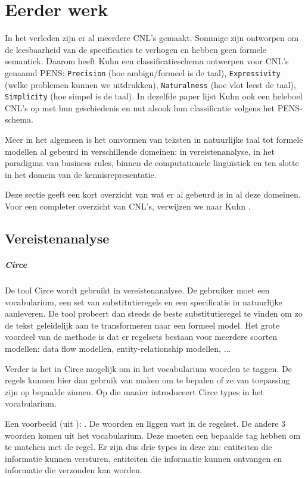 \chapter{Eerder werk}
\label{ch:related}
In het verleden zijn er al meerdere CNL's gemaakt. Sommige zijn ontworpen om de leesbaarheid van de specificaties te verhogen en hebben geen formele semantiek. Daarom heeft Kuhn \cite{Kuhn2014} een classificatieschema ontwerpen voor CNL's genaamd PENS: \texttt{Precision} (hoe ambigu/formeel is de taal), \texttt{Expressivity} (welke problemen kunnen we uitdrukken), \texttt{Naturalness} (hoe vlot leest de taal), \texttt{Simplicity} (hoe simpel is de taal). In dezelfde paper lijst Kuhn ook een heleboel CNL's op met hun geschiedenis en nut alsook hun classificatie volgens het PENS-schema.

Meer in het algemeen is het omvormen van teksten in natuurlijke taal tot formele modellen al gebeurd in verschillende domeinen: in vereistenanalyse, in het paradigma van business rules, binnen de computationele lingu\"istiek en ten slotte in het domein van de kennisrepresentatie.

Deze sectie geeft een kort overzicht van wat er al gebeurd is in al deze domeinen. Voor een completer overzicht van CNL's, verwijzen we naar Kuhn \cite{Kuhn2014}.

\section{Vereistenanalyse}
\paragraph{Circe} De tool Circe \cite{Ambriola1997} wordt gebruikt in vereistenanalyse. De gebruiker moet een vocabularium, een set van substitutieregels en een specificatie in natuurlijke aanleveren. De tool probeert dan steeds de beste substitutieregel te vinden om zo de tekst geleidelijk aan te transformeren naar een formeel model. Het grote voordeel van de methode is dat er regelsets bestaan voor meerdere soorten modellen: data flow modellen, entity-relationship modellen, ...

Verder is het in Circe mogelijk om in het vocabularium woorden te taggen. De regels kunnen hier dan gebruik van maken om te bepalen of ze van toepassing zijn op bepaalde zinnen. Op die manier introduceert Circe types in het vocabularium.

Een voorbeeld (uit \cite{Ambriola1997}): . De woorden  en  liggen vast in de regelset. De andere 3 woorden komen uit het vocabularium. Deze moeten een bepaalde tag hebben om te matchen met de regel. Er zijn dus drie types in deze zin: entiteiten die informatie kunnen versturen, entiteiten die informatie kunnen ontvangen en informatie die verzonden kan worden.

